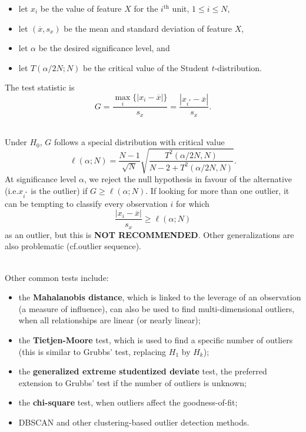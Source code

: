 \documentclass[20pt,landscape,footrule,headrule]{foils}
\newcommand{\newl}{\newline\newline}
\begin{document}
\begin{itemize}
\item let $x_i$ be the value of feature $X$ for the $i^{\textrm{th}}$ unit, $1\leq i\leq N$,\item  let $(\overline{x},s_x)$ be the mean and standard deviation of feature $X$, 
\item let $\alpha$ be the desired significance level, and 
\item let  $T(\alpha/2N;N)$ be the critical value of the Student $t$-distribution. 
\end{itemize} 
The test statistic is $$G=\frac{\max_i\{|x_i-\overline{x}|\}}{s_x}=\frac{|x_{i^*}-\overline{x}|}{s_x}.$$

\newpage\ \\ \noindent Under $H_0$, $G$ follows a special distribution with critical value $$\ell(\alpha;N)=\frac{N-1}{\sqrt{N}}\sqrt{\frac{T^2(\alpha/2N,N)}{N-2+T^2(\alpha/2N,N)}}.$$ 
At significance level $\alpha$, we reject the null hypothesis in favour of the alternative (i.e.\@ $x_{i^*}$ is the outlier) if  $G\geq \ell(\alpha;N)$.
\newl If looking for more than one outlier, it can be tempting to classify every observation $i$ for which 
$$\frac{|x_i-\overline{x}|}{s_x} \geq \ell(\alpha;N)$$ as an outlier, but this is \textbf{NOT RECOMMENDED}. 
\newl Other generalizations are also problematic (cf.\@ outlier sequence). 

\newpage\ \\ \noindent Other common tests include:
\begin{itemize}

\item the \textbf{Mahalanobis distance}, which is linked to the leverage of an observation (a measure of influence), can also be used to find multi-dimen\-sio\-nal outliers, when all relationships are linear (or nearly linear);

\item the \textbf{Tietjen-Moore} test, which is used to find a specific number of outliers (this is similar to Grubbs' test, replacing $H_1$ by $H_k$);

\item the \textbf{generalized extreme studentized deviate} test, the preferred extension to Grubbs' test if the number of outliers is unknown; 

\item the \textbf{chi-square} test, when outliers affect the goodness-of-fit;

\item DBSCAN and other clustering-based outlier detection methods.

\end{itemize}
\end{document}
